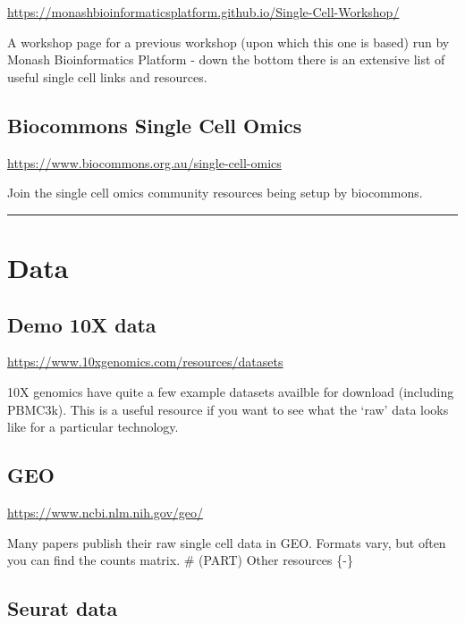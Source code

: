 \documentclass[
]{book}
\begin{document}
\url{https://monashbioinformaticsplatform.github.io/Single-Cell-Workshop/}

A workshop page for a previous workshop (upon which this one is based) run by Monash Bioinformatics Platform - down the bottom there
is an extensive list of useful single cell links and resources.

\hypertarget{biocommons-single-cell-omics}{%
\subsection*{Biocommons Single Cell Omics}\label{biocommons-single-cell-omics}}

\url{https://www.biocommons.org.au/single-cell-omics}

Join the single cell omics community resources being setup by biocommons.

\begin{center}\rule{0.5\linewidth}{0.5pt}\end{center}

\hypertarget{data}{%
\section{Data}\label{data}}

\hypertarget{demo-10x-data}{%
\subsection*{Demo 10X data}\label{demo-10x-data}}

\url{https://www.10xgenomics.com/resources/datasets}

10X genomics have quite a few example datasets availble for download (including PBMC3k).
This is a useful resource if you want to see what the `raw' data looks like for a particular technology.

\hypertarget{geo}{%
\subsection*{GEO}\label{geo}}

\url{https://www.ncbi.nlm.nih.gov/geo/}

Many papers publish their raw single cell data in GEO. Formats vary, but often you can find the counts matrix.
\# (PART) Other resources \{-\}

\hypertarget{seurat-data}{%
\subsection*{Seurat data}\label{seurat-data}}
\end{document}
